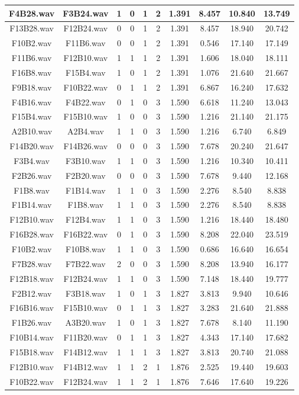 \documentclass[11pt,a4paper,twoside]{book}
\begin{document}
\begin{longtable}[c]{|c|c|c|c|c|c|c|c|c|c|}
F4B28.wav&F3B24.wav&1&0&1&2&1.391&8.457&10.840&13.749\\ \hline
F13B28.wav&F12B24.wav&0&0&1&2&1.391&8.457&18.940&20.742\\ \hline
F10B2.wav&F11B6.wav&0&0&1&2&1.391&0.546&17.140&17.149\\ \hline
F11B6.wav&F12B10.wav&1&1&1&2&1.391&1.606&18.040&18.111\\ \hline
F16B8.wav&F15B4.wav&1&0&1&2&1.391&1.076&21.640&21.667\\ \hline
F9B18.wav&F10B22.wav&0&1&1&2&1.391&6.867&16.240&17.632\\ \hline
F4B16.wav&F4B22.wav&0&1&0&3&1.590&6.618&11.240&13.043\\ \hline
F15B4.wav&F15B10.wav&1&0&0&3&1.590&1.216&21.140&21.175\\ \hline
A2B10.wav&A2B4.wav&1&1&0&3&1.590&1.216&6.740&6.849\\ \hline
F14B20.wav&F14B26.wav&0&0&0&3&1.590&7.678&20.240&21.647\\ \hline
F3B4.wav&F3B10.wav&1&1&0&3&1.590&1.216&10.340&10.411\\ \hline
F2B26.wav&F2B20.wav&0&0&0&3&1.590&7.678&9.440&12.168\\ \hline
F1B8.wav&F1B14.wav&1&1&0&3&1.590&2.276&8.540&8.838\\ \hline
F1B14.wav&F1B8.wav&1&1&0&3&1.590&2.276&8.540&8.838\\ \hline
F12B10.wav&F12B4.wav&1&1&0&3&1.590&1.216&18.440&18.480\\ \hline
F16B28.wav&F16B22.wav&0&1&0&3&1.590&8.208&22.040&23.519\\ \hline
F10B2.wav&F10B8.wav&1&1&0&3&1.590&0.686&16.640&16.654\\ \hline
F7B28.wav&F7B22.wav&2&0&0&3&1.590&8.208&13.940&16.177\\ \hline
F12B18.wav&F12B24.wav&1&1&0&3&1.590&7.148&18.440&19.777\\ \hline
F2B12.wav&F3B18.wav&1&0&1&3&1.827&3.813&9.940&10.646\\ \hline
F16B16.wav&F15B10.wav&0&1&1&3&1.827&3.283&21.640&21.888\\ \hline
F1B26.wav&A3B20.wav&1&0&1&3&1.827&7.678&8.140&11.190\\ \hline
F10B14.wav&F11B20.wav&0&1&1&3&1.827&4.343&17.140&17.682\\ \hline
F15B18.wav&F14B12.wav&1&1&1&3&1.827&3.813&20.740&21.088\\ \hline
F12B10.wav&F14B12.wav&1&1&2&1&1.876&2.525&19.440&19.603\\ \hline
F10B22.wav&F12B24.wav&1&1&2&1&1.876&7.646&17.640&19.226\\ \hline

\end{longtable}
\end{document}
